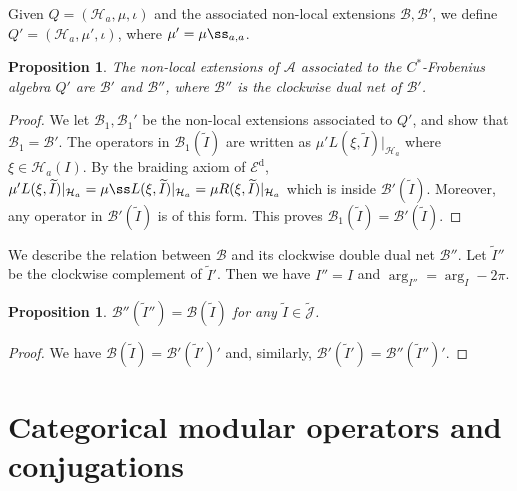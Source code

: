 \documentclass[12pt,a4paper]{article}
\theoremstyle{definition}
\theoremstyle{plain}
\newtheorem{pp}[df]{Proposition}
\newcommand{\mc}{\mathcal}
\newcommand{\wtd}{\widetilde}
\newcommand{\Jtd}{\widetilde{\mathcal J}}
\newcommand{\Ed}{\mathscr E^{\mathrm d}}
\numberwithin{equation}{section}
\begin{document}
Given $Q=(\mc H_a,\mu,\iota)$ and the associated non-local extensions $\mc B,\mc B'$, we define $Q'=(\mc H_a,\mu',\iota)$, where $\mu'=\mu\ss_{a,a}$.
\begin{pp}
The non-local extensions of $\mc A$ associated to the $C^*$-Frobenius algebra $Q'$ are $\mc B'$ and $\mc B''$, where $\mc B''$ is the clockwise dual net of $\mc B'$.
\end{pp}

\begin{proof}
We let $\mc B_1,\mc B_1'$ be the non-local extensions associated to $Q'$, and show that $\mc B_1=\mc B'$. The operators in $\mc B_1(\wtd I)$ are written as $\mu'L(\xi,\wtd I)|_{\mc H_a}$ where $\xi\in\mc H_a(I)$. By the braiding axiom of $\Ed$, $\mu'L(\xi,\wtd I)|_{\mc H_a}=\mu\ss L(\xi,\wtd I)|_{\mc H_a}=\mu R(\xi,\wtd I)|_{\mc H_a}$ which is inside $\mc B'(\wtd I)$. Moreover, any operator in $\mc B'(\wtd I)$ is of this form. This proves $\mc B_1(\wtd I)=\mc B'(\wtd I)$.
\end{proof}

We describe the relation between $\mc B$ and its  clockwise double dual net $\mc B''$. Let $\wtd I''$ be the clockwise complement of $\wtd I'$.  Then we have $I''=I$ and $\arg_{I''}=\arg_I-2\pi$.



\begin{pp}
$\mc B''(\wtd I'')=\mc B(\wtd I)$ for any $\wtd I\in\Jtd$.
\end{pp}
\begin{proof}
We have $\mc B(\wtd I)=\mc B'(\wtd I')'$  and, similarly, $\mc B'(\wtd I')=\mc B''(\wtd I'')'$.
\end{proof}


\section{Categorical modular operators and conjugations}
\end{document}
